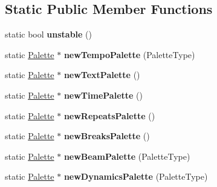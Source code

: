 \subsection*{Static Public Member Functions}
\begin{DoxyCompactItemize}
\item 
\mbox{\label{class_ms_1_1_muse_score_a6e674d36f7473280db086097b4e54127}} 
static bool {\bfseries unstable} ()
\item 
\mbox{\label{class_ms_1_1_muse_score_a9d76486c1f76f703fc4e12f611fb7e72}} 
static \hyperlink{class_ms_1_1_palette}{Palette} $\ast$ {\bfseries new\+Tempo\+Palette} (Palette\+Type)
\item 
\mbox{\label{class_ms_1_1_muse_score_a78a0e40393167d36a0d424dd19c3be5f}} 
static \hyperlink{class_ms_1_1_palette}{Palette} $\ast$ {\bfseries new\+Text\+Palette} ()
\item 
\mbox{\label{class_ms_1_1_muse_score_a915854cc925d55c63148d45a3ebc2af2}} 
static \hyperlink{class_ms_1_1_palette}{Palette} $\ast$ {\bfseries new\+Time\+Palette} ()
\item 
\mbox{\label{class_ms_1_1_muse_score_ad6d0ef136e2bb3d90a8efe9c69f51040}} 
static \hyperlink{class_ms_1_1_palette}{Palette} $\ast$ {\bfseries new\+Repeats\+Palette} ()
\item 
\mbox{\label{class_ms_1_1_muse_score_a6fe163ba79ef9ed4a39c4bb1908411a1}} 
static \hyperlink{class_ms_1_1_palette}{Palette} $\ast$ {\bfseries new\+Breaks\+Palette} ()
\item 
\mbox{\label{class_ms_1_1_muse_score_a043cd9d020a6e71475e6ae793c2e054a}} 
static \hyperlink{class_ms_1_1_palette}{Palette} $\ast$ {\bfseries new\+Beam\+Palette} (Palette\+Type)
\item 
\mbox{\label{class_ms_1_1_muse_score_af91d29b92cd7e6c052ed45792602f20f}} 
static \hyperlink{class_ms_1_1_palette}{Palette} $\ast$ {\bfseries new\+Dynamics\+Palette} (Palette\+Type)
\item 
\mbox{\label{class_ms_1_1_muse_score_a2e4a00a04ddcef47711b465a64b94ee5}} 

\end{DoxyCompactItemize}
